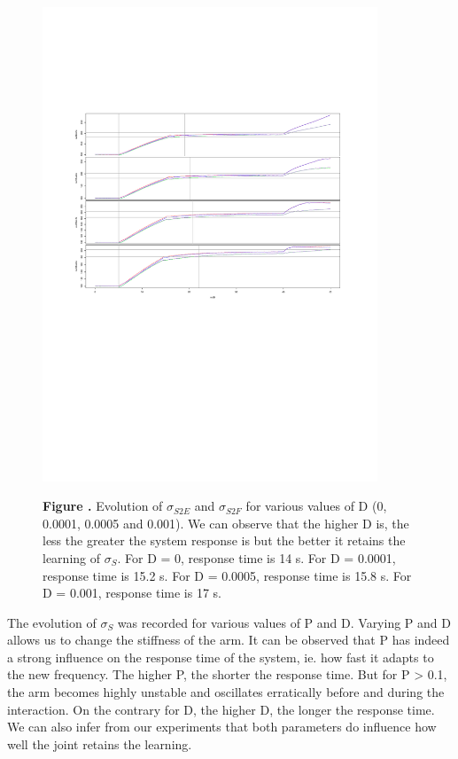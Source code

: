 \begin{figure}[h!]
\begin{center}
\includegraphics[width=10cm]{figures/simulation/varying_D}
\end{center}
 \textbf{\label{fig:20} Figure .} {Evolution of $\sigma_{S2E}$ and $\sigma_{S2F}$ for various values of D (0, 0.0001, 0.0005 and 0.001). We can observe that the higher D is, the less the greater the system response is but the better it retains the learning of $\sigma_S$. For D = 0, response time is 14 s. For D = 0.0001, response time is 15.2 s. For D = 0.0005, response time is 15.8 s. For D = 0.001, response time is 17 s.}
\end{figure}

The evolution of $\sigma_S$ was recorded for various values of P and D. Varying P and D allows us to change the stiffness of the arm. It can be observed that P has indeed a strong influence on the response time of the system, ie. how fast it adapts to the new frequency. The higher P, the shorter the response time. But for P > 0.1, the arm becomes highly unstable and oscillates erratically before and during the interaction. On the contrary for D, the higher D, the longer the response time. We can also infer from our experiments that both parameters do influence how well the joint retains the learning.

